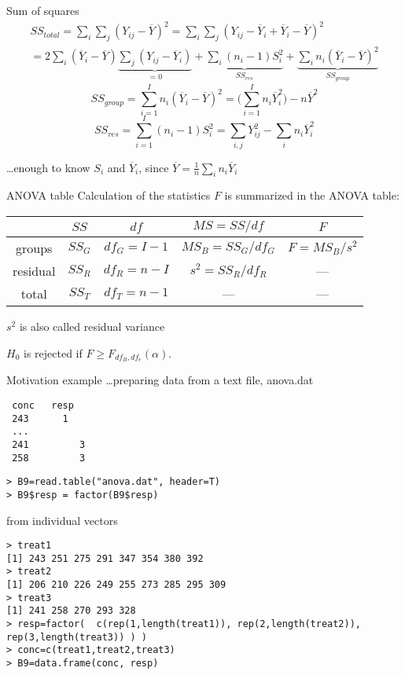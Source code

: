 \documentclass[smaller]{beamer}
\def\ol#1{\overline{#1}}
\def\blue#1{{\usebeamercolor[fg]{my blue} #1}}
\def\df#1{{\usebeamercolor[fg]{my orange} #1}}
\def\xskip{{\vspace{2ex}}}
\begin{document}
\begin{frame}{Sum of squares}
\begin{gather*}
  SS_{total}=\sum_i \sum_j (Y_{ij} - \ol{Y})^2 
  =\sum_i \sum_j (Y_{ij} - \ol{Y}_i + \ol{Y}_i - \ol{Y})^2 \\
  = 2\sum_i (\ol{Y}_i - \ol{Y}) \underbrace{\sum_j (Y_{ij} - \ol{Y}_i)}_{=0}
           +\underbrace{\sum_i (n_i-1)S_i^2}_{SS_{res}} + \underbrace{\sum_i n_i (\ol{Y}_i - \ol{Y})^2}_{SS_{group}}
\end{gather*}
\pause
\[
  SS_{group} = \sum_{i=1}^I n_i (\ol{Y}_i - \ol{Y})^2=\Big(\sum_{i=1}^I n_i \ol{Y}_i^2\Big) - n\ol{Y}^2
\]
\pause
\[
  SS_{res} = \sum_{i=1}^I (n_i - 1) S_i^2 = \sum_{i,j} Y_{ij}^2 - \sum_i n_i \ol{Y}_i^2
\]

\xskip
\dots enough to know $S_i$ and $\ol{Y}_i$, since $\ol{Y} = \frac{1}{n}\sum_i n_i \ol{Y}_i$
\end{frame}



\begin{frame}{ANOVA table}
Calculation of the statistics $F$ is summarized in the ANOVA table:

\xskip
\renewcommand*\arraystretch{1.5}
\begin{tabular}{c|c|c|c|c}
 & $SS$ & $df$ & $MS = SS/df$ & $F$ \\
\hline

groups & $SS_{G}$ & $df_G = I-1$ & $MS_B=SS_G / df_G$ & $F = MS_B / s^2$\\
\hline
residual &$SS_{R}$ & $df_R = n-I$ & $s^2 = SS_R / df_R$ &  --- \\
\hline
total & $SS_T$ & $df_T = n-1$ & ---  & ---
\end{tabular}

\xskip
$s^2$ is also called \df{residual variance}

\xskip
$H_0$ is rejected if $F \ge F_{df_B,df_e}(\alpha)$.
\end{frame}

\begin{frame}[fragile]{Motivation example \dots preparing data}
\blue{from a text file}, anova.dat
\begin{verbatim}
 conc   resp 
 243      1 
 ...
 241         3
 258         3 
\end{verbatim}
\begin{verbatim}
> B9=read.table("anova.dat", header=T)
> B9$resp = factor(B9$resp) 
\end{verbatim}
\blue{from individual vectors}
\begin{verbatim}
> treat1
[1] 243 251 275 291 347 354 380 392
> treat2
[1] 206 210 226 249 255 273 285 295 309
> treat3
[1] 241 258 270 293 328
> resp=factor(  c(rep(1,length(treat1)), rep(2,length(treat2)), rep(3,length(treat3)) ) )  
> conc=c(treat1,treat2,treat3)
> B9=data.frame(conc, resp) 
\end{verbatim}
\end{frame}
\end{document}

